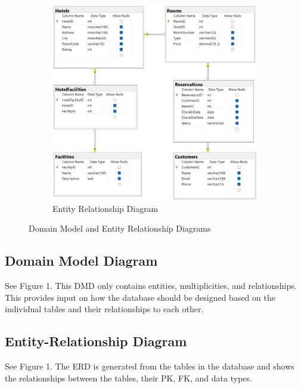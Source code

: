 \begin{figure}
\begin{subfigure}[b]{0.45\textwidth}
    \includegraphics[width=\textwidth]{figures/SWD_ERD_HotelManagement.png}
    \caption{Entity Relationship Diagram}\label{EntityRelationDiagram}
  \end{subfigure}
  \caption{Domain Model and Entity Relationship Diagrams}
\end{figure}

\subsection{Domain Model Diagram}
See Figure 1. This DMD only contains entities, multiplicities, and relationships.
This provides input on how the database should be designed based on the individual tables and their relationships to each other.

\subsection{Entity-Relationship Diagram}
See Figure 1. The ERD is generated from the tables in the database and shows the relationships between the tables, their PK, FK, and data types.
